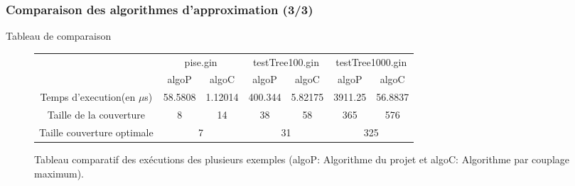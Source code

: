   \begin{frame}
   \frametitle{Comparaison des algorithmes d'approximation (3/3)}

   \begin{block}{Tableau de comparaison}
    \begin{figure}[!ht]
     \begin{center}
      \footnotesize
      \begin{tabular}{|c|c|c||c|c||c|c|}
       \cline{2-7}
       \multicolumn{1}{c|}{} & \multicolumn{2}{|c||}{pise.gin}
       &\multicolumn{2}{|c||}{testTree100.gin} &
       \multicolumn{2}{|c|}{testTree1000.gin}\\ 
       \cline{2-7}
       \multicolumn{1}{c|}{} & algoP & algoC & algoP & algoC & algoP &
       algoC\\
       \hline
       Temps d'execution(en $\mu$s) & 58.5808 & 1.12014 & 400.344 &
       5.82175 & 3911.25 & 56.8837\\
       \hline
       Taille de la couverture & 8 & 14 & 38 & 58 & 365 & 576\\
       \hline
       \hline
       Taille couverture optimale & \multicolumn{2}{|c||}{7} &
		   \multicolumn{2}{|c||}{31} &
       \multicolumn{2}{|c|}{325}\\ 
       \hline
      \end{tabular}
      \caption{Tableau comparatif des exécutions des plusieurs
      exemples (algoP: Algorithme du projet et algoC: Algorithme par
      couplage maximum).\label{tableau}} 
     \end{center}
    \end{figure}  
   \end{block}
  \end{frame}
